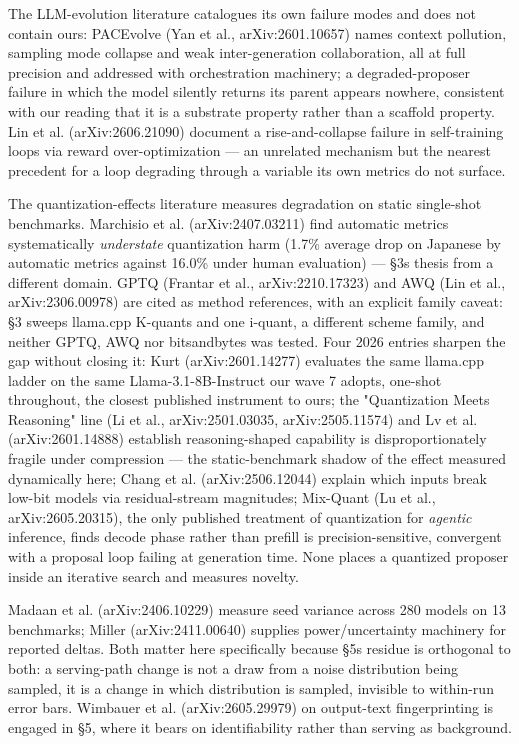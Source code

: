 The LLM-evolution literature catalogues its own failure modes and does not contain ours: PACEvolve (Yan et al., arXiv:2601.10657) names context pollution, sampling mode collapse and weak inter-generation collaboration, all at full precision and addressed with orchestration machinery; a degraded-proposer failure in which the model silently returns its parent appears nowhere, consistent with our reading that it is a substrate property rather than a scaffold property. Lin et al. (arXiv:2606.21090) document a rise-and-collapse failure in self-training loops via reward over-optimization --- an unrelated mechanism but the nearest precedent for a loop degrading through a variable its own metrics do not surface.

The quantization-effects literature measures degradation on static single-shot benchmarks. Marchisio et al. (arXiv:2407.03211) find automatic metrics systematically \emph{understate} quantization harm (1.7\% average drop on Japanese by automatic metrics against 16.0\% under human evaluation) --- §3\textquotesingle s thesis from a different domain. GPTQ (Frantar et al., arXiv:2210.17323) and AWQ (Lin et al., arXiv:2306.00978) are cited as method references, with an explicit family caveat: §3 sweeps llama.cpp K-quants and one i-quant, a different scheme family, and neither GPTQ, AWQ nor bitsandbytes was tested. Four 2026 entries sharpen the gap without closing it: Kurt (arXiv:2601.14277) evaluates the same llama.cpp ladder on the same Llama-3.1-8B-Instruct our wave 7 adopts, one-shot throughout, the closest published instrument to ours; the "Quantization Meets Reasoning" line (Li et al., arXiv:2501.03035, arXiv:2505.11574) and Lv et al. (arXiv:2601.14888) establish reasoning-shaped capability is disproportionately fragile under compression --- the static-benchmark shadow of the effect measured dynamically here; Chang et al. (arXiv:2506.12044) explain which inputs break low-bit models via residual-stream magnitudes; Mix-Quant (Lu et al., arXiv:2605.20315), the only published treatment of quantization for \emph{agentic} inference, finds decode phase rather than prefill is precision-sensitive, convergent with a proposal loop failing at generation time. None places a quantized proposer inside an iterative search and measures novelty.

Madaan et al. (arXiv:2406.10229) measure seed variance across 280 models on 13 benchmarks; Miller (arXiv:2411.00640) supplies power/uncertainty machinery for reported deltas. Both matter here specifically because §5\textquotesingle s residue is orthogonal to both: a serving-path change is not a draw from a noise distribution being sampled, it is a change in which distribution is sampled, invisible to within-run error bars. Wimbauer et al. (arXiv:2605.29979) on output-text fingerprinting is engaged in §5, where it bears on identifiability rather than serving as background.

